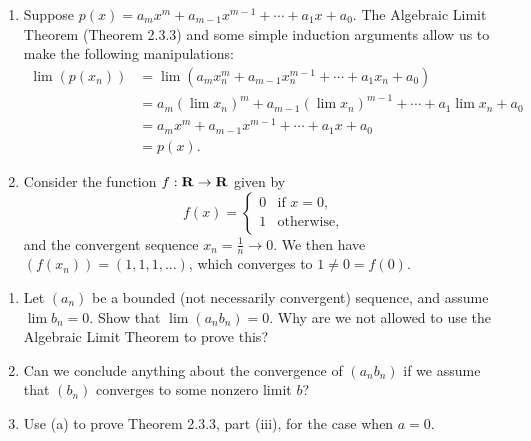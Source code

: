 \documentclass{lew98_solutions}
\begin{document}
\begin{solution}
    \begin{enumerate}
        \item Suppose \( p(x) = a_m x^m + a_{m-1} x^{m-1} + \cdots + a_1 x + a_0 \). The Algebraic Limit Theorem (Theorem 2.3.3) and some simple induction arguments allow us to make the following manipulations:
        \begin{align*}
            \lim (p(x_n)) &= \lim (a_m x_n^m + a_{m-1} x_n^{m-1} + \cdots + a_1 x_n + a_0) \\[2mm]
            &= a_m (\lim x_n)^m + a_{m-1} (\lim x_n)^{m-1} + \cdots + a_1 \lim x_n + a_0 \\[2mm]
            &= a_m x^m + a_{m-1} x^{m-1} + \cdots + a_1 x + a_0 \\[2mm]
            &= p(x).
        \end{align*}

        \item Consider the function \( f : \mathbf{R} \to \mathbf{R} \) given by
        \[
            f(x) = \begin{cases}
                0 & \text{if } x = 0, \\
                1 & \text{otherwise},
            \end{cases}
        \]
        and the convergent sequence \( x_n = \tfrac{1}{n} \to 0 \). We then have \( (f(x_n)) = (1, 1, 1, \ldots) \), which converges to \( 1 \neq 0 = f(0) \).
    \end{enumerate}
\end{solution}

\begin{exercise}
\label{ex:2.3.9}
    \begin{enumerate}
        \item Let \( (a_n) \) be a bounded (not necessarily convergent) sequence, and assume \( \lim b_n = 0 \). Show that \( \lim (a_n b_n) = 0 \). Why are we not allowed to use the Algebraic Limit Theorem to prove this?

        \item Can we conclude anything about the convergence of \( (a_n b_n) \) if we assume that \( (b_n) \) converges to some nonzero limit \( b \)?

        \item Use (a) to prove Theorem 2.3.3, part (iii), for the case when \( a = 0 \).
    \end{enumerate}
\end{exercise}
\end{document}
